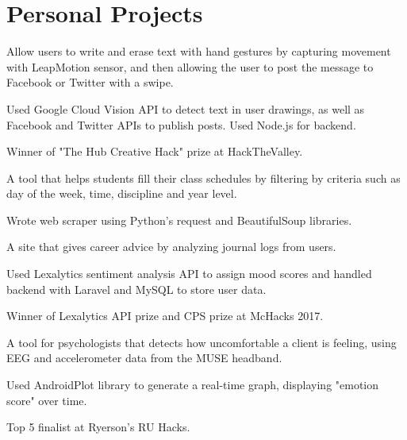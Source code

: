 \documentclass[]{deedy-resume-openfont}
\begin{document}
\begin{minipage}[t]{0.66\textwidth}

\section{Personal Projects}
\begin{tightemize}
\item Allow users to write and erase text with hand gestures by capturing movement with LeapMotion sensor, and then allowing the user to post the message to Facebook or Twitter with a swipe. 
\item Used Google Cloud Vision API to detect text in user drawings, as well as Facebook and Twitter APIs to publish posts. Used Node.js for backend.
\item Winner of "The Hub Creative Hack" prize at HackTheValley.
\end{tightemize}
\sectionsep

\begin{tightemize}
\item A tool that helps students fill their class schedules by filtering by criteria such as day of the week, time, discipline and year level.
\item Wrote web scraper using Python's request and BeautifulSoup libraries.
\end{tightemize}
\sectionsep

\begin{tightemize}
\item A site that gives career advice by analyzing journal logs from users.
\item Used Lexalytics sentiment analysis API to assign mood scores and handled backend with Laravel and MySQL to store user data.
\item Winner of Lexalytics API prize and CPS prize at McHacks 2017.
\end{tightemize}
\sectionsep

\begin{tightemize}
\item A tool for psychologists that detects how uncomfortable a client is feeling, using EEG and accelerometer data from the MUSE headband.
\item Used AndroidPlot library to generate a real-time graph, displaying "emotion score" over time. 
\item Top 5 finalist at Ryerson's RU Hacks.
\end{tightemize}
\sectionsep


\end{minipage} 
\end{document}
